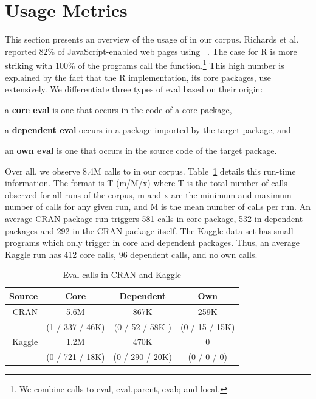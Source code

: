 \documentclass[conference]{IEEEtran}
\newcommand{\AllAllCallCountRnd}{8.4M\xspace}
\begin{document}
\section{Usage Metrics}

This section presents an overview of the usage of \eval in our corpus. Richards
et al. reported 82\% of JavaScript-enabled web pages using \eval~\cite{ecoop11}.
The case for R is more striking with 100\% of the programs call the \eval
function.\footnote{We combine calls to {\sf eval}, {\sf eval.parent}, {\sf
    evalq} and {\sf local}.} This high number is explained by the fact that the
R implementation, its core packages, use \eval extensively. We differentiate
three types of eval based on their origin:
%
\begin{compactitem}[$-$]
  \item a {\bf core eval} is one that occurs in the code of a core package,
  \item a {\bf dependent eval} occurs in a package imported by the target
  package, and
  \item an {\bf own eval} is one that occurs in the source code of the target
  package.
\end{compactitem}

Over all, we observe \AllAllCallCountRnd calls to \eval in our corpus.
Table~\ref{A} details this run-time information. The format is T (m/M/x)
where T is the total number of calls observed for all runs of the corpus, m
and x are the minimum and maximum number of calls for any given run, and M
is the mean number of calls per run. An average CRAN package run triggers
581 {\eval} calls in core package, 532 in dependent packages and 292 in the
CRAN package itself.  The Kaggle data set has small programs which only
trigger \eval in core and dependent packages. Thus, an average Kaggle run
has 412 core calls, 96 dependent calls, and no own calls.


\begin{table}[!h] \centering
 \begin{tabular}{r|c|c|c} \hline
Source & Core    & Dependent                      & Own \\\hline
CRAN   & 5.6M &  867K    & 259K \\
       & (1 / 337 / 46K)& (0 / 52 / 58K ) & (0 / 15 / 15K) \\\hline
Kaggle &  1.2M &  470K   & 0\\
 &  (0 / 721 / 18K) & (0 / 290 / 20K) & (0 / 0 / 0)\\\hline
\end{tabular}\caption{Eval calls in CRAN and Kaggle}\label{A}\end{table}
\end{document}

